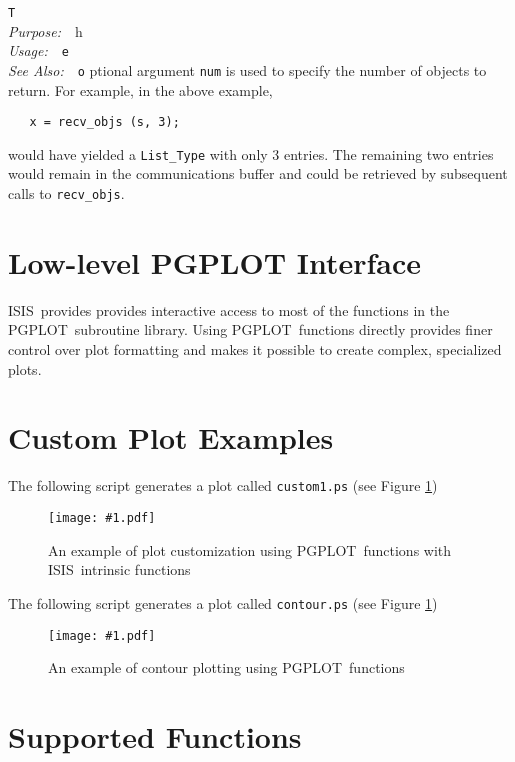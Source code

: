 \documentclass{book}
\makeatletter
\newif\ifpdf
\newcommand{\putfig}[1]{\texttt{[image: \#1.pdf]}}
\newcommand{\putfig}[1]{\psfig{file=#1.ps}}
\newcommand{\isisx}{{\sc ISIS~}}
\newcommand{\pgplot}{{\sc PGPLOT}}
\newenvironment{isisfunction}[4]%
{\index{{#1}@{\tt #1}}%
  \ifpdf
  \else
     \addcontentsline{toc}{subsection}{{#1} -- {#2}}
  \fi
  \vbox{
          \vspace*{\baselineskip}
          {\LARGE\tt #1}\vspace*{\baselineskip}\\
          {{\it Purpose:}~~{#2}}\\
          {{\it Usage:}~~{\tt #3}}\\
          {{\it See Also:}~~{\tt #4}}
       }
}%
{ }
\makeatother
\begin{document}
{\begin{isisfunction}
The optional argument \verb|num| is used to specify the number
of objects to return.  For example, in the above example,
\begin{verbatim}
   x = recv_objs (s, 3);
\end{verbatim}
would have yielded a \verb|List_Type| with only 3 entries. The
remaining two entries would remain in the communications buffer
and could be retrieved by subsequent calls to \verb|recv_objs|.
\end{isisfunction}

\section{Low-level PGPLOT Interface}
\label{chap:pgplot-module}

\isisx provides provides interactive access to most of the
functions in the \pgplot\ subroutine library. Using \pgplot\
functions directly provides finer control over plot formatting and
makes it possible to create complex, specialized plots.

\section{Custom Plot Examples}

The following script generates a plot called {\tt custom1.ps} (see Figure
\ref{fig:custom1})

\begin{figure}[ht]
\putfig{figures/custom1}
\caption{An example of plot customization using \pgplot\ functions with
\isisx intrinsic functions}
\label{fig:custom1}
\end{figure}



\clearpage

The following script generates a plot called {\tt contour.ps} (see Figure
\ref{fig:custom1})

\begin{figure}[ht]
\putfig{figures/contour}
\caption{An example of contour plotting using \pgplot\ functions}
\label{fig:contour}
\end{figure}



\clearpage

\section{Supported Functions}

}
\end{document}
